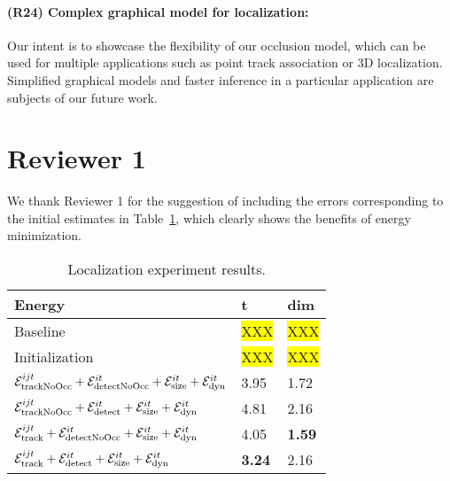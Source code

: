 \documentclass[10pt,twocolumn,letterpaper]{article}
\newcommand{\hili}[1]{\colorbox{yellow}{#1}}
\begin{document}



\vspace{-0.4cm}
\paragraph{(R24) Complex graphical model for localization:} Our intent is to showcase the flexibility of our occlusion model, which can be used for multiple applications such as point track association or 3D localization. Simplified graphical models and faster inference in a particular application are subjects of our future work.


\section{Reviewer 1}

We thank Reviewer 1 for the suggestion of including the errors corresponding to the initial estimates in Table~\ref{tab:localization}, which clearly shows the benefits of energy minimization.   

\begin{table}\centering\footnotesize
\begin{tabular}{|l|l|l|}
\hline
Energy & t & dim \\
\hline
\hline
Baseline & \hili{XXX} & \hili{XXX} \\
Initialization & \hili{XXX} & \hili{XXX} \\
$\mathcal{E}^{ijt}_{\text{trackNoOcc}} + \mathcal{E}^{it}_{\text{detectNoOcc}} +\mathcal{E}^{it}_{\text{size}}+\mathcal{E}^{it}_{\text{dyn}}$ 
& 3.95  & 1.72\\        
$\mathcal{E}^{ijt}_{\text{trackNoOcc}} + \mathcal{E}^{it}_{\text{detect}} +\mathcal{E}^{it}_{\text{size}}+\mathcal{E}^{it}_{\text{dyn}}$        
& 4.81  & 2.16\\        
$\mathcal{E}^{ijt}_{\text{track}} + \mathcal{E}^{it}_{\text{detectNoOcc}} +\mathcal{E}^{it}_{\text{size}}+\mathcal{E}^{it}_{\text{dyn}}$      
& 4.05  & {\bf 1.59}\\        
$\mathcal{E}^{ijt}_{\text{track}} + \mathcal{E}^{it}_{\text{detect}} +\mathcal{E}^{it}_{\text{size}}+\mathcal{E}^{it}_{\text{dyn}}$             
& {\bf 3.24}  & 2.16\\
\hline
\end{tabular}
\caption{Localization experiment results.}
\label{tab:localization}
\end{table}
\end{document}
